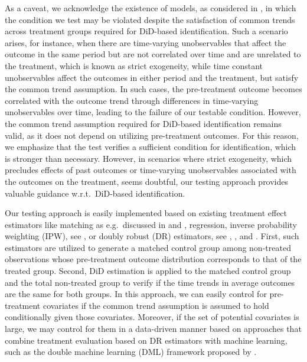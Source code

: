 {	As a caveat, we acknowledge the existence of models, as considered in \cite{ghanem2022selection}, in which the condition we test may be violated despite the satisfaction of common trends across treatment groups required for DiD-based identification. Such a scenario arises, for instance, when there are time-varying unobservables that affect the outcome in the same period but are not correlated over time and are unrelated to the treatment, which is known as strict exogeneity, while time constant unobservables affect the outcomes in either period and the treatment, but satisfy the common trend assumption. In such cases, the pre-treatment outcome becomes correlated with the outcome trend through differences in time-varying unobservables over time, leading to the failure of our testable condition. However, the common trend assumption required for DiD-based identification remains valid, as it does not depend on utilizing pre-treatment outcomes. For this reason, we emphasize that the test verifies a sufficient condition for identification, which is stronger than necessary. However, in scenarios where strict exogeneity, which precludes effects of past outcomes or time-varying unobservables associated with the outcomes on the treatment, seems doubtful, our testing approach provides valuable guidance w.r.t.\ DiD-based identification.
	
	Our testing approach is easily implemented based on existing treatment effect estimators like matching as e.g.\ discussed in \cite{rosenbaum1983} and \cite{RosenbaumRubin1985}, regression, inverse probability weighting (IPW), see \cite{HoTh52}, or doubly robust (DR) estimators, see \cite{Robins+94}, \cite{RoRoZa95}, and \cite{RoRo95}. First, such estimators are utilized to generate a matched control group among non-treated observations whose pre-treatment outcome distribution corresponds to that of the treated group. Second, DiD estimation is applied to the matched control group and the total non-treated group to verify if the time trends in average outcomes are the same for both groups. In this approach, we can easily control for pre-treatment covariates if the common trend assumption is assumed to hold conditionally given those covariates. Moreover, if the set of potential covariates is large, we may control for them in a data-driven manner based on approaches that combine treatment evaluation based on DR estimators with machine learning, such as the double machine learning (DML) framework proposed by \cite{Chetal2018}.
	
}
